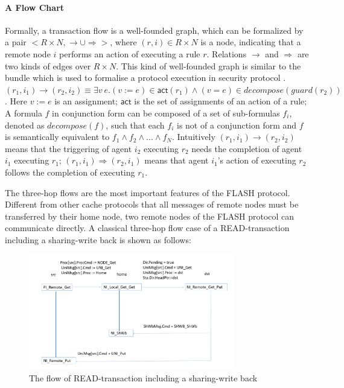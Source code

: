 \documentclass{llncs-new}
\begin{document}
\vspace{-5pt}

\paragraph*{A Flow Chart}Formally, a transaction flow is a well-founded graph, which can be formalized by a pair $<R \times N, \rightarrow \cup \Rightarrow>$, where $(r,i) \in R \times N$ is a  node, indicating that a remote node $i$ performs an action of executing a rule $r$. Relations  $\rightarrow$  and $\Rightarrow$ are two kinds of edges over $R \times N$. This kind of well-founded graph is similar to the bundle which is used to formalise a protocol execution in security protocol \cite{LP13}.   $(r_1,i_1) \rightarrow (r_2,i_2) \equiv \exists v~e. (v:=e) \in \mathsf{act}(r_1) \land (v=e) \in decompose(guard(r_2))$. Here $v:=e$ is an assignment; $\mathsf{act}$ is the set of assignments of an action of a rule; A formula $f$ in conjunction form can be composed of a set of sub-formulas $f_i$, denoted as $decompose(f)$, such that each $f_i$  is not of a conjunction form and $f$ is semantically equivalent to $f_1 \land f_2 \land ... \land f_N$. Intuitively $(r_1,i_1) \rightarrow (r_2,i_2)$ means that the triggering of agent $i_2$ executing $r_2$ needs the completion of agent $i_1$ executing $r_1$; $(r_1,i_1) \Rightarrow (r_2,i_1)$ means that agent $i_1$'s action of executing $r_2$ follows the completion of  executing $r_1$. %

The three-hop flows are the most important features of the FLASH protocol. Different from other cache protocols that all messages of remote nodes must be transferred by their home node, two remote nodes of the FLASH protocol can communicate directly. A classical three-hop flow case of a READ-transaction including a sharing-write back is shown as follows:

\vspace{-15pt}
\begin{figure}[htbp]
\centering
\includegraphics[width=0.8\textwidth]{flow2.pdf}
\vspace{-20pt}
\caption{The flow of READ-transaction including a sharing-write back\label{fig:arch}}
\end{figure}
\vspace{-15pt}
\end{document}
